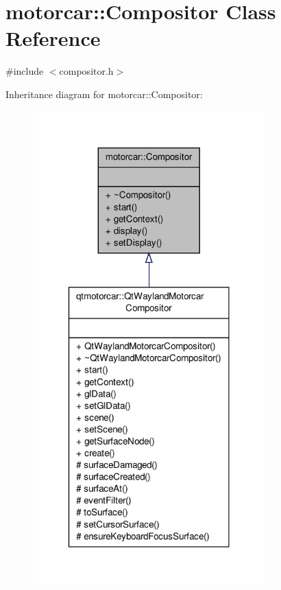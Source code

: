 \hypertarget{classmotorcar_1_1Compositor}{\section{motorcar\-:\-:Compositor Class Reference}
\label{classmotorcar_1_1Compositor}
}


{\ttfamily \#include $<$compositor.\-h$>$}



Inheritance diagram for motorcar\-:\-:Compositor\-:
\nopagebreak
\begin{figure}[H]
\begin{center}
\leavevmode
\includegraphics[width=254pt]{classmotorcar_1_1Compositor__inherit__graph}
\end{center}
\end{figure}


